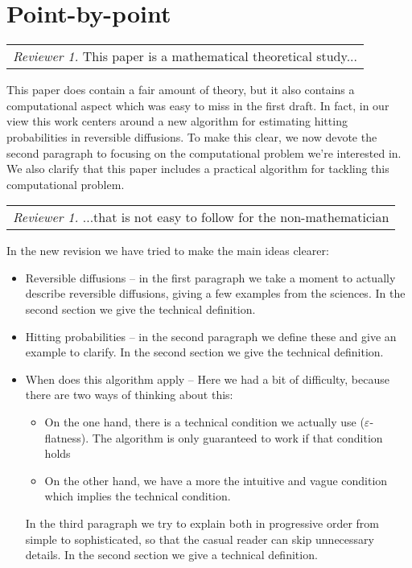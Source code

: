 \documentclass{article}
\begin{document}

\section{Point-by-point}

\newcommand{\rev}[3]{\noindent\begin{tabular}{|p{4.5in}}\emph{Reviewer #1.}  #2\end{tabular}\vspace{.1in}

#3\vspace{.3in}}

\rev{1}{This paper is a mathematical theoretical study...}{

This paper does contain a fair amount of theory, but it also contains a computational aspect which was easy to miss in the first draft.  In fact, in our view this work centers around a new algorithm for estimating hitting probabilities in reversible diffusions.  To make this clear, we now devote the second paragraph to focusing on the computational problem we're interested in.  We also clarify that this paper includes a practical algorithm for tackling this computational problem.}

\rev{1}{...that is not easy to follow for the non-mathematician}{

In the new revision we have tried to make the main ideas clearer:
\begin{itemize}
    \item Reversible diffusions -- in the first paragraph we take a moment to actually describe reversible diffusions, giving a few examples from the sciences.  In the second section we give the technical definition.  
    \item Hitting probabilities -- in the second paragraph we define these and give an example to clarify.  In the second section we give the technical definition.
    \item When does this algorithm apply -- Here we had a bit of difficulty, because there are two ways of thinking about this:
    \begin{itemize}
        \item On the one hand, there is a technical condition we actually use ($\varepsilon$-flatness).  The algorithm is only guaranteed to work if that condition holds
        \item On the other hand, we have a more the intuitive and vague condition which implies the technical condition. 
    \end{itemize} 
    In the third paragraph we try to explain both in progressive order from simple to sophisticated, so that the casual reader can skip unnecessary details.  In the second section we give a technical definition.
\end{itemize}
} 
\end{document}
